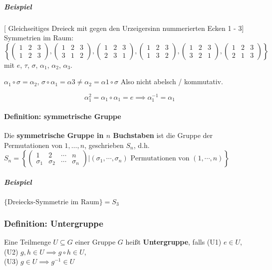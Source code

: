 \documentclass[14pt,a4paper]{article}
\begin{document}
    \subparagraph{Beispiel}
    [ Gleichseitiges Dreieck mit gegen den Urzeigersinn nummerierten Ecken 1 - 3]\\
    Symmetrien im Raum: $$ \left\{
      \begin{pmatrix} 1 & 2 & 3 \\ 1 & 2 & 3 \end{pmatrix},
      \begin{pmatrix} 1 & 2 & 3 \\ 3 & 1 & 2 \end{pmatrix},
      \begin{pmatrix} 1 & 2 & 3 \\ 2 & 3 & 1 \end{pmatrix},
      \begin{pmatrix} 1 & 2 & 3 \\ 1 & 3 & 2 \end{pmatrix},
      \begin{pmatrix} 1 & 2 & 3 \\ 3 & 2 & 1 \end{pmatrix},
      \begin{pmatrix} 1 & 2 & 3 \\ 2 & 1 & 3 \end{pmatrix}
    \right\}$$
    mit $e$, $\tau$, $\sigma$, $\alpha_1$, $\alpha_2$, $\alpha_3$.

    $\alpha_1 \circ \sigma = \alpha_2$, $\sigma \circ \alpha_1 = \alpha 3 \neq
    \alpha_2 = \alpha1 \circ \sigma$
    Also nicht abelsch / kommutativ.

    $$ \alpha_1^2 = \alpha_1 \circ \alpha_1 = e \implies \alpha_1^{-1} =
    \alpha_1$$

    \paragraph{Definition: symmetrische Gruppe}
    Die \textbf{symmetrische Gruppe in $n$ Buchstaben} ist die Gruppe der
    Permutationen von ${1, \dots, n}$, geschrieben $S_n$, d.h. $S_n =
    \left\{ \begin{pmatrix} 1 & 2 & \cdots & n \\ \sigma_1 & \sigma_2 & \cdots &
   	 \sigma_n \end{pmatrix} | (\sigma_1, \dotsb, \sigma_n) \text{ Permutationen
   	 von } (1, \dotsb, n) \right\}$

    \subparagraph{Beispiel}
    $\{\text{Dreiecks-Symmetrie im Raum}\} = S_3$

    \subsubsection{Definition: Untergruppe}
    Eine Teilmenge $U \subseteq G$ einer Gruppe $G$ heißt \textbf{Untergruppe},
    falls (U1) $e \in U$, (U2) $g,h \in U \implies g \circ h \in U$, \\ (U3) $g \in U
    \implies g^{-1} \in U$
\end{document}
